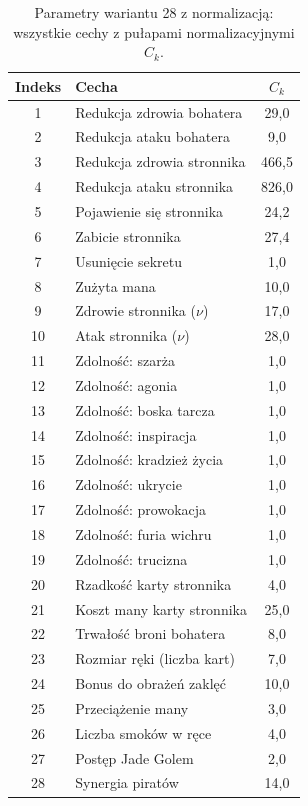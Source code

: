 \begin{table}[!h]
\centering
\caption{Parametry wariantu 28 z normalizacją: wszystkie cechy z pułapami normalizacyjnymi $C_k$.}
\label{tab:weights28norm}
\begin{tabular}{clc}
\toprule
Indeks & Cecha & $C_k$ \\
\midrule
1  & Redukcja zdrowia bohatera                & 29{,}0    \\
2  & Redukcja ataku bohatera                  &  9{,}0    \\
3  & Redukcja zdrowia stronnika               & 466{,}5   \\
4  & Redukcja ataku stronnika                 & 826{,}0   \\
5  & Pojawienie się stronnika                 &  24{,}2   \\
6  & Zabicie stronnika                        &  27{,}4   \\
7  & Usunięcie sekretu                        &   1{,}0   \\
8  & Zużyta mana                              &  10{,}0   \\
9  & Zdrowie stronnika ($\nu$)                &  17{,}0   \\
10 & Atak stronnika ($\nu$)                   &  28{,}0   \\
11 & Zdolność: szarża                         &   1{,}0   \\
12 & Zdolność: agonia                         &   1{,}0   \\
13 & Zdolność: boska tarcza                   &   1{,}0   \\
14 & Zdolność: inspiracja                     &   1{,}0   \\
15 & Zdolność: kradzież życia                 &   1{,}0   \\
16 & Zdolność: ukrycie                        &   1{,}0   \\
17 & Zdolność: prowokacja                     &   1{,}0   \\
18 & Zdolność: furia wichru                   &   1{,}0   \\
19 & Zdolność: trucizna                       &   1{,}0   \\
20 & Rzadkość karty stronnika                 &   4{,}0   \\
21 & Koszt many karty stronnika               &  25{,}0   \\
22 & Trwałość broni bohatera                  &   8{,}0   \\
23 & Rozmiar ręki (liczba kart)               &   7{,}0   \\
24 & Bonus do obrażeń zaklęć                  &  10{,}0   \\
25 & Przeciążenie many                        &   3{,}0   \\
26 & Liczba smoków w ręce                     &   4{,}0   \\
27 & Postęp Jade Golem                        &   2{,}0   \\
28 & Synergia piratów                         &  14{,}0   \\
\bottomrule
\end{tabular}
\end{table}

